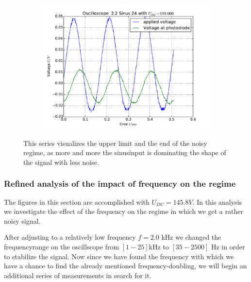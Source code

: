 \begin{figure}
\begin{subfigure}[b]{\picwidth}
        \caption{}
    \end{subfigure}
    \begin{subfigure}[b]{\picwidth}
        \includegraphics[width=\textwidth]{analysis/figures/22sinus24}
        \caption{}
    \end{subfigure}

    \caption{This series visualizes the upper limit and the end
        of the noisy regime, as more and more the sinusinput
        is dominating the shape of the signal with less noise.}
    \label{fig:sinus4}
\end{figure}
\clearpage
\subsubsection{Refined analysis of the impact of frequency on 
    the regime}
The figures in this section are accomplished with $U_{DC}=145.8 V$.
In this analysis we investigate the effect of the frequency
on the regime in which we get a rather noisy signal. 

After
adjusting to a relatively low frequency $f=2.0$ kHz we changed
the frequencyrange on the oscillscope from 
$[1 - 25]$kHz to $[35 - 2500]$ Hz in order to stabilize the signal.
Now since we have found the frequency with which we have a chance
to find the already mentioned frequency-doubling, we will
begin an additional series of measurements in search for it. 

